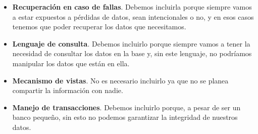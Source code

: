 \documentclass[letterpaper,12pt]{article}
\begin{document}
\begin{enumerate}[a. ]
\begin{itemize}
		\item \textbf{Recuperación en caso de fallas}. Debemos incluirla porque siempre vamos a estar expuestos a pérdidas de datos, sean intencionales o no, y en esos casos tenemos que poder recuperar los datos que necesitamos.

		\item \textbf{Lenguaje de consulta}. Debemos incluirlo porque siempre vamos a tener la necesidad de consultar los datos en la base y, sin este lenguaje, no podríamos manipular los datos que están en ella. 

		\item \textbf{Mecanismo de vistas}. No es necesario incluirlo ya que no se planea compartir la información con nadie. 

		\item \textbf{Manejo de transacciones}. Debemos incluirlo porque, a pesar de ser un banco pequeño, sin esto no podemos garantizar la integridad de nuestros datos.

	\end{itemize}	

          \end{enumerate}
\end{document}
